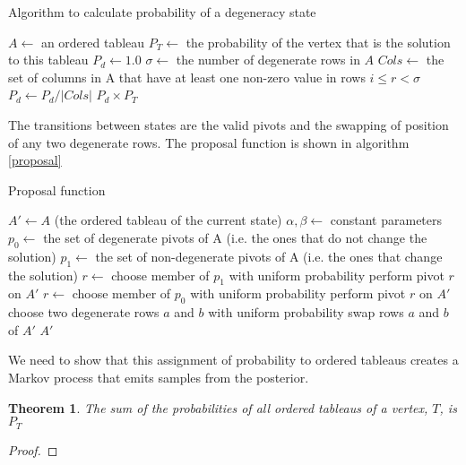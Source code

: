 \documentclass{article}
\newtheorem{theorem}{Theorem}
\begin{document}
\begin{algorithm}
\caption{Algorithm to calculate probability of a degeneracy state}
\label{probAlgorithm}
\begin{algorithmic}
\State $A \leftarrow$ an ordered tableau
\State $P_T \leftarrow$ the probability of the vertex that is the solution to this tableau
\State $P_d \leftarrow 1.0$
\State $\sigma \leftarrow$ the number of degenerate rows in $A$
	\State $Cols \leftarrow$ the set of columns in A that have at least one non-zero value in rows $i \le r < \sigma$
	\State $P_d \leftarrow P_d/|Cols|$
\EndFor
\State \Return $P_d \times P_T$
\end{algorithmic}
\end{algorithm}

The transitions between states are the valid pivots and the swapping of position of any two degenerate rows. The proposal function is shown in algorithm \ref{proposal}

\begin{algorithm}
\caption{Proposal function}
\label{proposal}
\begin{algorithmic}
\State $A' \leftarrow A$ (the ordered tableau of the current state)
\State $\alpha, \beta \leftarrow$ constant parameters
\State $p_0 \leftarrow$ the set of degenerate pivots of A (i.e. the ones that do not change the solution)
\State $p_1 \leftarrow$ the set of non-degenerate pivots of A (i.e. the ones that change the solution)
  \State $r \leftarrow$ choose member of $p_1$ with uniform probability
  \State perform pivot $r$ on $A'$
  \State $r \leftarrow$ choose member of $p_0$ with uniform probability
  \State perform pivot $r$ on $A'$
\Else
  \State choose two degenerate rows $a$ and $b$ with uniform probability
  \State swap rows $a$ and $b$ of $A'$ 
\EndIf
\State \Return $A'$
\EndFunction
\end{algorithmic}
\end{algorithm}

We need to show that this assignment of probability to ordered tableaus creates a Markov process that emits samples from the posterior. 

\begin{theorem}
The sum of the probabilities of all ordered tableaus of a vertex, $T$, is $P_T$ 
\end{theorem}
\begin{proof}

\end{proof}
\end{document}
